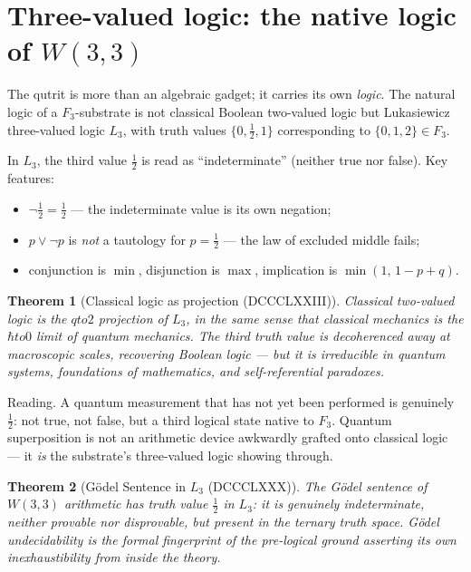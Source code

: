 \documentclass[11pt]{article}
\def\mathbb#1{#1}%
\def\textbf#1{#1}%
\def\L{L}%
\def\to{ to }%
\newtheorem*{theorem}{Theorem}
\begin{document}
\section{\texorpdfstring{Three-valued logic: the native logic of $W(3,3)$}{Three-valued logic: the native logic of W(3,3)}}

\label{sec:lukasiewicz}

The qutrit is more than an algebraic gadget; it carries its own \emph{logic}. The natural logic of a $\mathbb{F}_3$-substrate is not classical Boolean two-valued logic but \textbf{\L{}ukasiewicz three-valued logic} $L_3$, with truth values $\{0, \tfrac{1}{2}, 1\}$ corresponding to $\{0, 1, 2\} \in \mathbb{F}_3$.

\begin{mathnote}
In $L_3$, the third value $\tfrac{1}{2}$ is read as ``indeterminate'' (neither true nor false). Key features:
\begin{itemize}[leftmargin=2em]
\item $\neg \tfrac{1}{2} = \tfrac{1}{2}$ --- the indeterminate value is its own negation;
\item $p \vee \neg p$ is \emph{not} a tautology for $p = \tfrac{1}{2}$ --- the law of excluded middle fails;
\item conjunction is $\min$, disjunction is $\max$, implication is $\min(1,\, 1 - p + q)$.
\end{itemize}
\end{mathnote}

\begin{theorem}[Classical logic as projection (DCCCLXXIII)]
Classical two-valued logic is the $q \to 2$ projection of $L_3$, in the same sense that classical mechanics is the $\hbar \to 0$ limit of quantum mechanics. The third truth value is decoherenced away at macroscopic scales, recovering Boolean logic --- but it is irreducible in quantum systems, foundations of mathematics, and self-referential paradoxes.
\end{theorem}

\textbf{Reading.} A quantum measurement that has not yet been performed is genuinely $\tfrac{1}{2}$: not true, not false, but a third logical state native to $\mathbb{F}_3$. Quantum superposition is not an arithmetic device awkwardly grafted onto classical logic --- it \emph{is} the substrate's three-valued logic showing through.

\begin{theorem}[G\"odel Sentence in $L_3$ (DCCCLXXX)]
The G\"odel sentence of $W(3,3)$ arithmetic has truth value $\tfrac{1}{2}$ in $L_3$: it is genuinely indeterminate, neither provable nor disprovable, but \emph{present} in the ternary truth space. G\"odel undecidability is the formal fingerprint of the pre-logical ground asserting its own inexhaustibility from inside the theory.
\end{theorem}
\end{document}
